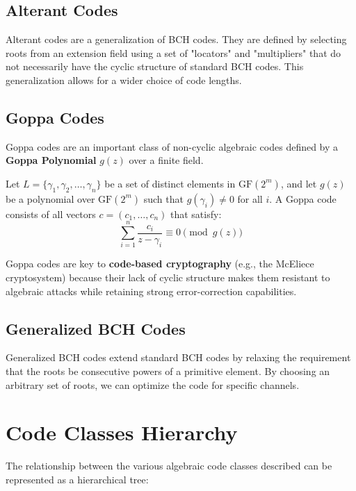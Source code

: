 \documentclass[12pt,a4paper]{article}
\begin{document}
\subsection{Alterant Codes}
Alterant codes are a generalization of BCH codes. They are defined by selecting roots from an extension field using a set of "locators" and "multipliers" that do not necessarily have the cyclic structure of standard BCH codes. This generalization allows for a wider choice of code lengths.

\subsection{Goppa Codes}
Goppa codes are an important class of non-cyclic algebraic codes defined by a \textbf{Goppa Polynomial} $g(z)$ over a finite field.
\begin{tcolorbox}[defbox, title={\textbf{Goppa Code Definition}}]
Let $L = \{\gamma_1, \gamma_2, \dots, \gamma_n\}$ be a set of distinct elements in $\text{GF}(2^m)$, and let $g(z)$ be a polynomial over $\text{GF}(2^m)$ such that $g(\gamma_i) \neq 0$ for all $i$. A Goppa code consists of all vectors $c = (c_1, \dots, c_n)$ that satisfy:
\[ \sum_{i=1}^n \frac{c_i}{z - \gamma_i} \equiv 0 \pmod{g(z)} \]
\end{tcolorbox}
Goppa codes are key to \textbf{code-based cryptography} (e.g., the McEliece cryptosystem) because their lack of cyclic structure makes them resistant to algebraic attacks while retaining strong error-correction capabilities.

\subsection{Generalized BCH Codes}
Generalized BCH codes extend standard BCH codes by relaxing the requirement that the roots be consecutive powers of a primitive element. By choosing an arbitrary set of roots, we can optimize the code for specific channels.

\section{Code Classes Hierarchy}

The relationship between the various algebraic code classes described can be represented as a hierarchical tree:
\end{document}
